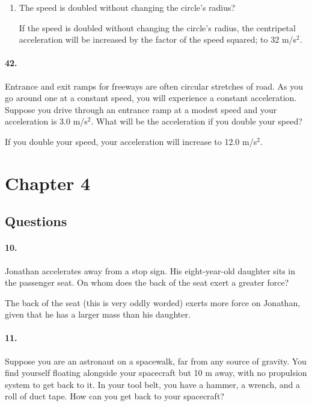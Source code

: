 \begin{multicols*}{2}
\begin{enumerate}[label=\alph*.]
            \item The speed is doubled without changing the circle's radius?
            
            \begin{mdframed}
                If the speed is doubled without changing the circle's radius, the centripetal acceleration will be increased by the factor of the speed squared; to 32 m/s$^2$.
            \end{mdframed}
        \end{enumerate}

        \paragraph*{42.}
        Entrance and exit ramps for freeways are often circular stretches of road. As you go around one at a constant speed, you will experience a constant acceleration. Suppose you drive through an entrance ramp at a modest speed and your acceleration is 3.0 m/s$^2$. What will be the acceleration if you double your speed?

        \begin{mdframed}
            If you double your speed, your acceleration will increase to 12.0 m/s$^2$.
        \end{mdframed}

        \section*{Chapter 4}
        \subsection*{Questions}

        \paragraph*{10.}
        Jonathan accelerates away from a stop sign. His eight-year-old daughter sits in the passenger seat. On whom does the back of the seat exert a greater force?

        \begin{mdframed}
            The back of the seat (this is very oddly worded) exerts more force on Jonathan, given that he has a larger mass than his daughter.
        \end{mdframed}

        \paragraph*{11.}
        Suppose you are an astronaut on a spacewalk, far from any source of gravity. You find yourself floating alongside your spacecraft but 10 m away, with no propulsion system to get back to it. In your tool belt, you have a hammer, a wrench, and a roll of duct tape. How can you get back to your spacecraft?


\end{multicols*}
